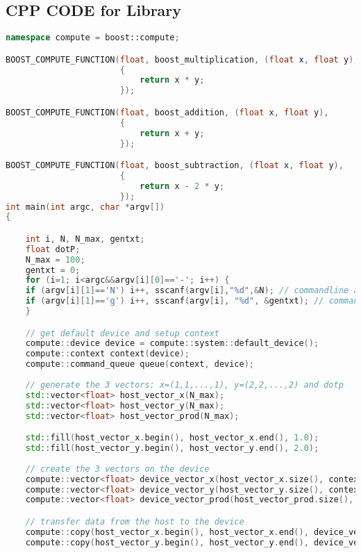 \begin{appendix}
\addappheadtotoc
\section{CPP CODE for  Library}
\label{app_1a}
\begin{lstlisting}[language=C++, title=CPP CODE for \fun{Boost.Compute} Library]  
namespace compute = boost::compute;

BOOST_COMPUTE_FUNCTION(float, boost_multiplication, (float x, float y),
                       {
                           return x * y;
                       });

BOOST_COMPUTE_FUNCTION(float, boost_addition, (float x, float y),
                       {
                           return x + y;
                       });

BOOST_COMPUTE_FUNCTION(float, boost_subtraction, (float x, float y),
                       {
                           return x - 2 * y;
                       });
int main(int argc, char *argv[])
{

    int i, N, N_max, gentxt;
    float dotP;
    N_max = 100;
    gentxt = 0;
    for (i=1; i<argc&&argv[i][0]=='-'; i++) {
    if (argv[i][1]=='N') i++, sscanf(argv[i],"%d",&N); // commandline arg -N for adjusting max. count, if none given N=100
    if (argv[i][1]=='g') i++, sscanf(argv[i], "%d", &gentxt); // commandline arg. -g for generating a txt, if none given, no .txt NOT IMPLEMENTED
    }

    // get default device and setup context
    compute::device device = compute::system::default_device();
    compute::context context(device);
    compute::command_queue queue(context, device);
    
    // generate the 3 vectors: x=(1,1,...,1), y=(2,2,...,2) and dotp
    std::vector<float> host_vector_x(N_max);
    std::vector<float> host_vector_y(N_max);
    std::vector<float> host_vector_prod(N_max);

    std::fill(host_vector_x.begin(), host_vector_x.end(), 1.0);
    std::fill(host_vector_y.begin(), host_vector_y.end(), 2.0);
    
    // create the 3 vectors on the device
    compute::vector<float> device_vector_x(host_vector_x.size(), context);
    compute::vector<float> device_vector_y(host_vector_y.size(), context);
    compute::vector<float> device_vector_prod(host_vector_prod.size(), context);

    // transfer data from the host to the device
    compute::copy(host_vector_x.begin(), host_vector_x.end(), device_vector_x.begin(), queue);
    compute::copy(host_vector_y.begin(), host_vector_y.end(), device_vector_y.begin(), queue);
    

\end{lstlisting}
\end{appendix}
